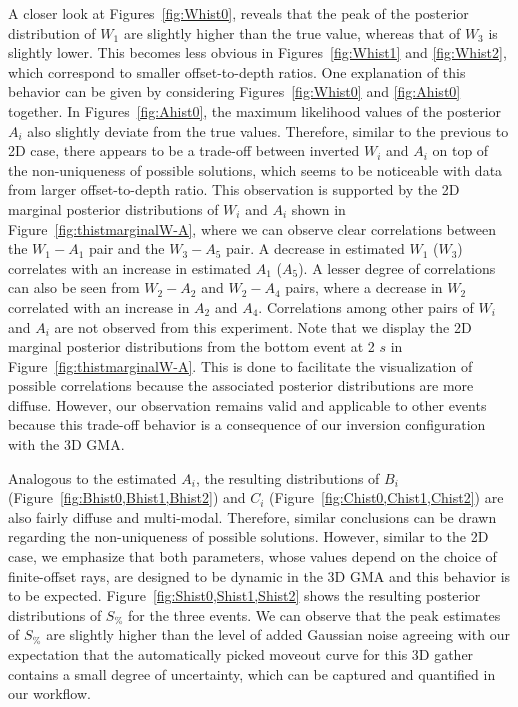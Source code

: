 A closer look at Figures~\ref{fig:Whist0}, reveals that the peak of the posterior distribution of $W_1$ are slightly higher than the true value, whereas that of $W_3$ is slightly lower. This becomes less obvious in Figures~\ref{fig:Whist1} and \ref{fig:Whist2}, which correspond to smaller offset-to-depth ratios. One explanation of this behavior can be given by considering Figures~\ref{fig:Whist0} and \ref{fig:Ahist0} together. In Figures~\ref{fig:Ahist0}, the maximum likelihood values of the posterior $A_i$ also slightly deviate from the true values. Therefore, similar to the previous to 2D case, there appears to be a trade-off between inverted $W_i$ and $A_i$ on top of the non-uniqueness of possible solutions, which seems to be noticeable with data from larger offset-to-depth ratio. This observation is supported by the 2D marginal posterior distributions of $W_i$ and $A_i$ shown in Figure~\ref{fig:thistmarginalW-A}, where we can observe clear correlations between the $W_1-A_1$ pair and the $W_3-A_5$ pair. A decrease in estimated $W_1$ ($W_3$) correlates with an increase in estimated $A_1$ ($A_5$). A lesser degree of correlations can also be seen from $W_2-A_2$ and $W_2-A_4$ pairs, where a decrease in $W_2$ correlated with an increase in $A_2$ and $A_4$. Correlations among other pairs of $W_i$ and $A_i$ are not observed from this experiment. Note that we display the 2D marginal posterior distributions from the bottom event at 2 $s$ in Figure~\ref{fig:thistmarginalW-A}. This is done to facilitate the visualization of possible correlations because the associated posterior distributions are more diffuse. However, our observation remains valid and applicable to other events because this trade-off behavior is a consequence of our inversion configuration with the 3D GMA.


Analogous to the estimated $A_i$, the resulting distributions of $B_i$ (Figure~\ref{fig:Bhist0,Bhist1,Bhist2}) and $C_i$ (Figure~\ref{fig:Chist0,Chist1,Chist2}) are also fairly diffuse and multi-modal. Therefore, similar conclusions can be drawn regarding the non-uniqueness of possible solutions. However, similar to the 2D case, we emphasize that both parameters, whose values depend on the choice of finite-offset rays, are designed to be dynamic in the 3D GMA and this behavior is to be expected. Figure~\ref{fig:Shist0,Shist1,Shist2} shows the resulting posterior distributions of $S_{\%}$ for the three events. We can observe that the peak estimates of $S_{\%}$ are slightly higher than the level of added Gaussian noise agreeing with our expectation that the automatically picked moveout curve for this 3D gather contains a small degree of uncertainty, which can be captured and quantified in our workflow.

